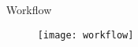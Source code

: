 \begin{frame}[t]

\begin{columns}[t] %

\begin{column}{.025\textwidth}\end{column} %

\begin{column}{.465\textwidth} %


\begin{block}{Workflow}

    \begin{figure}
        \centering
        
        \texttt{[image: workflow]}
                
    \end{figure}
%
% 
    
\end{block}

\end{column}



\end{columns}
\end{frame}
